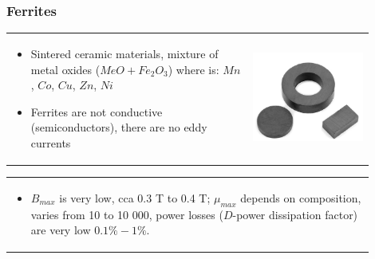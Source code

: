 \documentclass{beamer}
\begin{document}
	\begin{frame}
	\frametitle{Ferrites}
		\begin{tabular}{m{0.6\linewidth} m{0.3\linewidth}}
		\begin{itemize}
		\item Sintered ceramic materials, mixture of metal oxides ($MeO + Fe_2O_3$) where \uv{$Me$} is: $Mn$, $Co$, $Cu$, $Zn$, $Ni$ 
		\item Ferrites are not conductive (semiconductors), there are no eddy currents
	\end{itemize} 
	& \includegraphics[scale=0.3]{obr12_ferrity.png}
	\end{tabular}
	\begin{tabular}{p{0.9\linewidth}}
	\begin{itemize}
		\item $B_{max}$ is very low, cca 0.3 T to 0.4 T; $\mu_{max}$ depends on composition, varies from 10 to 10 000, power losses ($D$-power dissipation factor) are very low $0.1\% -1\%$.
	\end{itemize} 
	\end{tabular}
  \end{frame}
\end{document}
